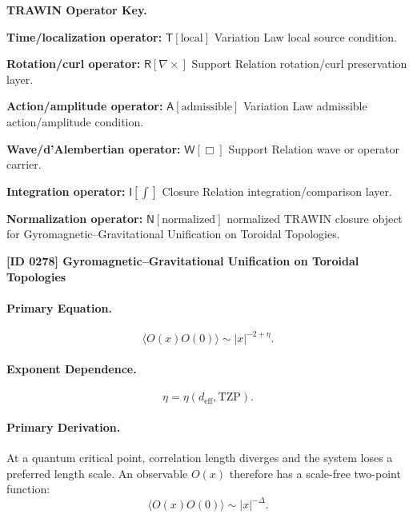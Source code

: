 \par\vspace{0.45\baselineskip}
\noindent\begin{minipage}[t]{\linewidth}
\begingroup
\small
\raggedright
\textbf{TRAWIN Operator Key.}\par
\noindent\textbf{Time/localization operator:} $\mathsf{T}\!\left[\mathrm{local}\right]$ Variation Law local source condition.\par
\noindent\textbf{Rotation/curl operator:} $\mathsf{R}\!\left[\nabla\times\right]$ Support Relation rotation/curl preservation layer.\par
\noindent\textbf{Action/amplitude operator:} $\mathsf{A}\!\left[\mathrm{admissible}\right]$ Variation Law admissible action/amplitude condition.\par
\noindent\textbf{Wave/d'Alembertian operator:} $\mathsf{W}\!\left[\Box\right]$ Support Relation wave or operator carrier.\par
\noindent\textbf{Integration operator:} $\mathsf{I}\!\left[\int\right]$ Closure Relation integration/comparison layer.\par
\noindent\textbf{Normalization operator:} $\mathsf{N}\!\left[\mathrm{normalized}\right]$ normalized TRAWIN closure object for Gyromagnetic--Gravitational Unification on Toroidal Topologies.\par
\endgroup
\end{minipage}

\clearpage
\noindent\textbf{[ID 0278] Gyromagnetic--Gravitational Unification on Toroidal Topologies}\par
\vspace{0.35em}
\paragraph{Primary Equation.}
\begin{equation}
\langle O(x)O(0)\rangle
\sim
|x|^{-2+\eta}.
\end{equation}

\paragraph{Exponent Dependence.}
\begin{equation}
\eta=\eta(d_{\mathrm{eff}},\mathrm{TZP}).
\end{equation}

\paragraph{Primary Derivation.}
At a quantum critical point, correlation length diverges and the system loses a preferred length scale.  
An observable $O(x)$ therefore has a scale-free two-point function:
\begin{equation}
\langle O(x)O(0)\rangle
\sim
|x|^{-\Delta}.
\end{equation}

